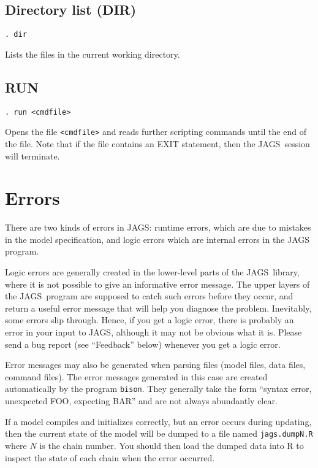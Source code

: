 \documentclass[11pt, a4paper, titlepage]{report}
\newcommand{\JAGS}{\textsf{JAGS}}
\begin{document}
\subsection{Directory list (DIR)}
\begin{verbatim}
. dir
\end{verbatim}
Lists the files in the current working directory.

\subsection{RUN}
\begin{verbatim}
. run <cmdfile>
\end{verbatim}
Opens the file \texttt{<cmdfile>} and reads further scripting commands
until the end of the file.  Note that if the file contains an EXIT
statement, then the \JAGS\ session will terminate. 


\section{Errors}

There are two kinds of errors in \JAGS: runtime errors, which are due to
mistakes in the model specification, and logic errors which are internal
errors in the JAGS program. 

Logic errors are generally created in the lower-level parts of the \JAGS\
library, where it is not possible to give an informative error message.
The upper layers of the \JAGS\ program are supposed to catch such errors
before they occur, and return a useful error message that will help you
diagnose the problem.  Inevitably, some errors slip through. Hence,
if you get a logic error, there is probably an error in your input to
\JAGS, although it may not be obvious what it is. Please send a bug
report (see ``Feedback'' below) whenever you get a logic error.

Error messages may also be generated when parsing files (model files,
data files, command files).  The error messages generated in this case
are created automatically by the program \texttt{bison}. They
generally take the form ``syntax error, unexpected FOO, expecting BAR''
and are not always abundantly clear.

If a model compiles and initializes correctly, but an error occurs
during updating, then the current state of the model will be dumped
to a file named \verb+jags.dumpN.R+ where $N$ is the chain number.
You should then load the dumped data into R to inspect the state of
each chain when the error occurred.
\end{document}
